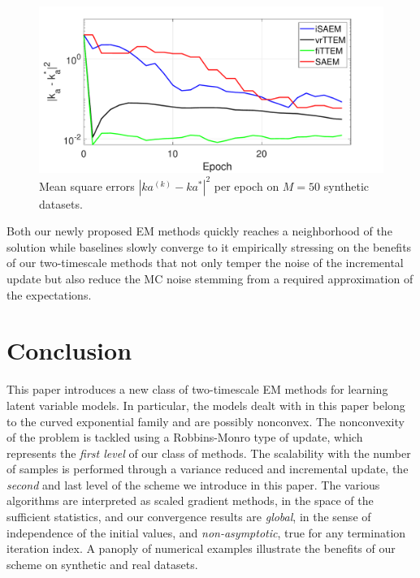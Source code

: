 \documentclass[12pt]{article}
\begin{document}
\begin{figure}[H]
\centering
\includegraphics[width=4.8in]{fig/figpk-eps-converted-to.pdf}
\caption{Mean square errors $|ka^{(k)} - ka^*|^2$ per epoch on $M=50$ synthetic datasets.}
\label{fig:pk_tts}
\end{figure}\vspace{-0.1in}
Both our newly proposed EM methods quickly reaches a neighborhood of the solution while baselines slowly converge to it empirically stressing on the benefits of our two-timescale methods that not only temper the noise of the incremental update but also reduce the MC noise stemming from a required approximation of the expectations.



\vspace{-0.05in}
\section{Conclusion}
\vspace{-0.05in}

This paper introduces a new class of two-timescale EM methods for learning latent variable models.
In particular, the models dealt with in this paper belong to the curved exponential family and are possibly nonconvex.
The nonconvexity of the problem is tackled using a Robbins-Monro type of update, which represents the \textit{first level} of our class of methods.
The scalability with the number of samples is performed through a variance reduced and incremental update, the \textit{second} and last level of the scheme we introduce in this paper.
The various algorithms are interpreted as scaled gradient methods, in the space of the sufficient statistics, and our convergence results are \emph{global}, in the sense of independence of the initial values, and \emph{non-asymptotic}, \ie true for any termination iteration index.
A panoply of numerical examples illustrate the benefits of our scheme on synthetic and real datasets.
\end{document}
